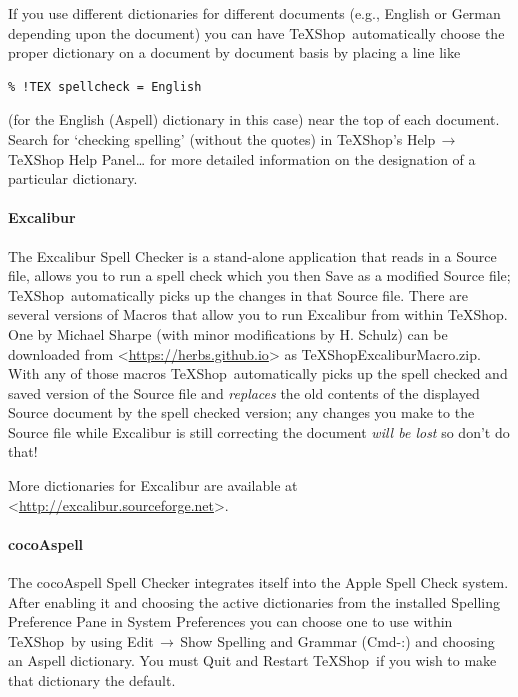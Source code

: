 \documentclass[letterpaper,11pt]{article}
\newcommand{\TS}{\textsf{\TeX Shop}}
\newcommand{\cmd}[1]{\textsf{#1}}
\newcommand{\mnu}[1]{\textsf{#1}}
\newcommand{\To}{\,\(\to\)\,}
\begin{document}
If you use different dictionaries for different documents (e.g., English or German depending upon the document) you can have \TS\ automatically choose the proper dictionary on a document by document basis by placing a line like
\begin{verbatim}
% !TEX spellcheck = English
\end{verbatim}
(for the \cmd{English (Aspell)} dictionary in this case) near the top of each document. Search for `\cmd{checking spelling}' (without the quotes) in \TS's \mnu{Help}\To\mnu{TeXShop Help Panel…} for more detailed information on the designation of a particular dictionary.

\paragraph{\cmd{Excalibur}}

The \cmd{Excalibur} Spell Checker is a stand-alone application that reads in a Source file, allows you to run a spell check which you then Save as a modified Source file; \TS\ automatically picks up the changes in that Source file. There are several versions of Macros that allow you to run \cmd{Excalibur} from within \TS. One by Michael Sharpe (with minor modifications by H. Schulz) can be downloaded from <\url{https://herbs.github.io}> as \cmd{TeXShopExcaliburMacro.zip}. With any of those macros \TS\ automatically picks up the spell checked and saved version of the Source file and \emph{replaces} the old contents of the displayed Source document by the spell checked version; any changes you make to the Source file while \cmd{Excalibur} is still correcting the document \emph{will be lost} so don't do that!

More dictionaries for \cmd{Excalibur} are available at <\url{http://excalibur.sourceforge.net}>.

\paragraph{\cmd{cocoAspell}}

The \cmd{cocoAspell} Spell Checker integrates itself into the Apple Spell Check system. After enabling it and choosing the active dictionaries from the installed \cmd{Spelling} Preference Pane in \cmd{System Preferences} you can choose one to use within \TS\ by using \mnu{Edit}\To\mnu{Show Spelling and Grammar} (\cmd{Cmd-:}) and choosing an \cmd{Aspell} dictionary. You must \cmd{Quit} and Restart \TS\ if you wish to make that dictionary the default.
\end{document}
